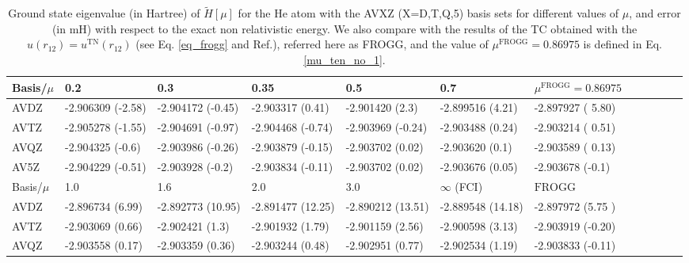 \documentclass[aip,jcp,reprint,noshowkeys,superscriptaddress]{revtex4-1}
\newcommand{\frogg}[0]{\text{FROGG}}
\newcommand{\mfrogg}[0]{\mu^\text{FROGG}}
\begin{document}
\begin{table}
\label{table_conv_e_mu}
\caption{Ground state eigenvalue (in Hartree) of $\tilde{H}[\mu]$ for the He atom with the AVXZ (X=D,T,Q,5) basis sets for different values of $\mu$, and error (in mH) with respect to the exact non relativistic energy. 
We also compare with the results of the TC obtained with the $u(r_{12}) = u^{\text{TN}}(r_{12})$ (see Eq. \eqref{eq_frogg} and Ref.), referred here as FROGG, and the value of $\mfrogg=0.86975$ is defined in Eq. \eqref{mu_ten_no_1}. 
 }
\begin{ruledtabular}
\begin{tabular}{llllllllllll}
 Basis/$\mu$ & 0.2                   & 0.3                   & 0.35                  & 0.5                  & 0.7                 & $\mfrogg=0.86975$    \\
\hline                                                                                                                                                  
 AVDZ        &    -2.906309 (-2.58)  &    -2.904172 (-0.45)  &    -2.903317 (0.41)   &    -2.901420 (2.3)   &    -2.899516 (4.21) &  -2.897927 ( 5.80)    \\
 AVTZ        &    -2.905278 (-1.55)  &    -2.904691 (-0.97)  &    -2.904468 (-0.74)  &    -2.903969 (-0.24) &    -2.903488 (0.24) &  -2.903214 ( 0.51)    \\
 AVQZ        &    -2.904325 (-0.6)   &    -2.903986 (-0.26)  &    -2.903879 (-0.15)  &    -2.903702 (0.02)  &    -2.903620 (0.1)  &  -2.903589 ( 0.13)     \\
 AV5Z        &    -2.904229 (-0.51)  &    -2.903928 (-0.2)   &    -2.903834 (-0.11)  &    -2.903702 (0.02)  &    -2.903676 (0.05) &  -2.903678 (-0.1)     \\
\hline
 Basis/$\mu$ & 1.0                   & 1.6                   & 2.0                   & 3.0                  & $\infty$ (FCI)       &     $\frogg$        \\
\hline                                                                                                                                                   
 AVDZ        &    -2.896734 (6.99)   &    -2.892773 (10.95)  &    -2.891477 (12.25)  &    -2.890212 (13.51) &    -2.889548 (14.18) &    -2.897972 (5.75 )\\
 AVTZ        &    -2.903069 (0.66)   &    -2.902421 (1.3)    &    -2.901932 (1.79)   &    -2.901159 (2.56)  &    -2.900598 (3.13)  &    -2.903919 (-0.20)\\
 AVQZ        &    -2.903558 (0.17)   &    -2.903359 (0.36)   &    -2.903244 (0.48)   &    -2.902951 (0.77)  &    -2.902534 (1.19)  &    -2.903833 (-0.11)\\

\end{tabular}
\end{ruledtabular}
\end{table}
\end{document}
